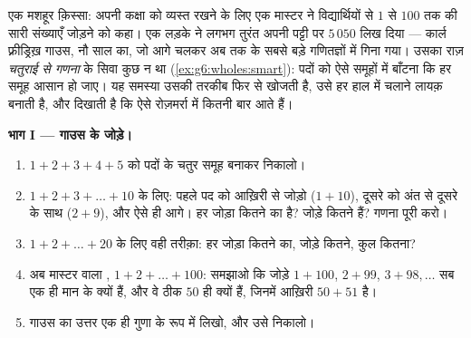 \begin{problem}
\label{pb:g6:wholes:1}
एक मशहूर क़िस्सा: अपनी कक्षा को व्यस्त रखने के लिए एक मास्टर ने
विद्यार्थियों से $1$ से $100$ तक की सारी संख्याएँ जोड़ने को कहा।
एक लड़के ने लगभग तुरंत अपनी पट्टी पर $5\,050$ लिख दिया --- कार्ल
फ़्रीड्रिख़ गाउस, नौ साल का, जो आगे चलकर अब तक के सबसे बड़े
गणितज्ञों में गिना गया। उसका राज़ \emph{चतुराई से गणना} के सिवा
कुछ न था (\cref{ex:g6:wholes:smart}): पदों को ऐसे समूहों में
बाँटना कि हर समूह आसान हो जाए। यह समस्या उसकी तरकीब फिर से खोजती
है, उसे हर हाल में चलाने लायक़ बनाती है, और दिखाती है कि ऐसे 
रोज़मर्रा में कितनी बार आते हैं।

\medskip
\noindent\textbf{भाग I --- गाउस के जोड़े।}
\begin{enumerate}
  \item $1 + 2 + 3 + 4 + 5$ को पदों के चतुर समूह बनाकर निकालो।
  \item $1 + 2 + 3 + \dots + 10$ के लिए: पहले पद को आख़िरी से
        जोड़ो ($1 + 10$), दूसरे को अंत से दूसरे के साथ
        ($2 + 9$), और ऐसे ही आगे। हर जोड़ा कितने का है? जोड़े
        कितने हैं? गणना पूरी करो।
  \item $1 + 2 + \dots + 20$ के लिए वही तरीक़ा: हर जोड़ा कितने
        का, जोड़े कितने, कुल कितना?
  \item अब मास्टर वाला , $1 + 2 + \dots + 100$: समझाओ कि
        जोड़े $1 + 100$, $2 + 99$, $3 + 98, \dots$ सब एक ही मान
        के क्यों हैं, और वे ठीक $50$ ही क्यों हैं, जिनमें
        आख़िरी $50 + 51$ है।
  \item गाउस का उत्तर एक ही गुणा के रूप में लिखो, और उसे
        निकालो।
\end{enumerate}


\end{problem}
